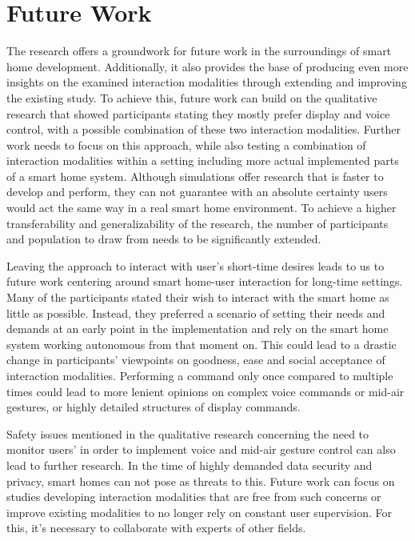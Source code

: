 \documentclass[sigchi]{acmart}
\begin{document}
	\section{Future Work}
	The research offers a groundwork for future work in the surroundings of smart home development. Additionally, it also provides the base of producing even more insights on the examined interaction modalities through extending and improving the existing study. To achieve this, future work can build on the qualitative research that showed participants stating they mostly prefer display and voice control, with a possible combination of these two interaction modalities. Further work needs to focus on this approach, while also testing a combination of interaction modalities within a setting including more actual implemented parts of a smart home system. Although simulations offer research that is faster to develop and perform, they can not guarantee with an absolute certainty users would act the same way in a real smart home environment. To achieve a higher transferability and generalizability of the research, the number of participants and population to draw from needs to be significantly extended. 
	
	Leaving the approach to interact with user's short-time desires leads to us to future work centering around smart home-user interaction for long-time settings. Many of the participants stated their wish to interact with the smart home as little as possible. Instead, they preferred a scenario of setting their needs and demands at an early point in the implementation and rely on the smart home system working autonomous from that moment on. This could lead to a drastic change in participants' viewpoints on goodness, ease and social acceptance of interaction modalities. Performing a command only once compared to multiple times could lead to more lenient opinions on complex voice commands or mid-air gestures, or highly detailed structures of display commands.
	
	Safety issues mentioned in the qualitative research concerning the need to monitor users' in order to implement voice and mid-air gesture control can also lead to further research. In the time of highly demanded data security and privacy, smart homes can not pose as threats to this. Future work can focus on studies developing interaction modalities that are free from such concerns or improve existing modalities to no longer rely on constant user supervision. For this, it's necessary to collaborate with experts of other fields.
	
\end{document}
